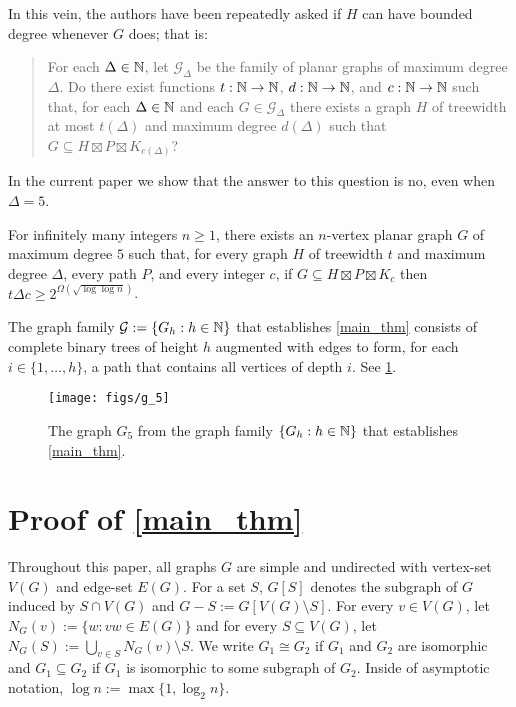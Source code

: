 \documentclass{patmorin}
\newcommand\subsetcong{\mathrel{\text{%
    \setbox0\hbox{$\subseteq$}%
    \rlap{\hbox to \wd0{\hss\hss\hss\raisebox{1.5\height}{$\sim$}\hss}}\box0
}}}
\renewcommand{\subsetcong}{\subseteq}
\renewcommand{\ge}{\geqslant}
\begin{document}
In this vein, the authors have been repeatedly asked if $H$ can have bounded degree whenever $G$ does; that is:
\begin{quote}
  For each $\Delta\in\mathbb{N}$, let $\mathcal{G}_\Delta$ be the family of planar graphs of maximum degree $\Delta$.  Do there exist functions $t:\mathbb{N}\to\mathbb{N}$, $d:\mathbb{N}\to\mathbb{N}$, and $c:\mathbb{N}\to\mathbb{N}$ such that, for each $\Delta\in\mathbb{N}$ and each $G\in\mathcal{G}_\Delta$ there exists a graph $H$ of treewidth at most $t(\Delta)$ and maximum degree $d(\Delta)$ such that $G\subsetcong H\boxtimes P\boxtimes K_{c(\Delta)}$?
\end{quote}
In the current paper we show that the answer to this question is no, even when $\Delta=5$.

\begin{thm}\label{main_thm}
  For infinitely many integers $n\ge 1$, there exists an $n$-vertex planar graph $G$ of maximum degree $5$ such that, for every graph $H$ of treewidth $t$ and maximum degree $\Delta$, every path $P$, and every integer $c$, if $G\subsetcong H\boxtimes P\boxtimes K_c$ then $t\Delta c \ge 2^{\Omega(\sqrt{\log\log n})}$.
\end{thm}

The graph family $\mathcal{G}:=\{G_h:h\in\mathbb{N}\}$ that establishes \cref{main_thm} consists of complete binary trees of height $h$ augmented with edges to form, for each $i\in\{1,\ldots,h\}$, a path that contains all vertices of depth $i$.  See \cref{G_5}.

\begin{figure}
  \begin{center}
    \texttt{[image: figs/g\_5]}
  \end{center}
  \caption{The graph $G_5$ from the graph family $\{G_h:h\in\mathbb{N}\}$ that establishes \cref{main_thm}.}
  \label{G_5}
\end{figure}

\section{Proof of \cref{main_thm}}

Throughout this paper, all graphs $G$ are simple and undirected with vertex-set $V(G)$ and edge-set $E(G)$.  For a set $S$, $G[S]$ denotes the subgraph of $G$ induced by $S\cap V(G)$ and $G-S:=G[V(G)\setminus S]$.  For every $v\in V(G)$, let $N_G(v):=\{w:vw\in E(G)\}$ and for every $S\subseteq V(G)$, let $N_G(S):=\bigcup_{v\in S} N_G(v)\setminus S$.  We write $G_1\cong G_2$ if $G_1$ and $G_2$ are isomorphic and $G_1\subsetcong G_2$ if $G_1$ is isomorphic to some subgraph of $G_2$.  Inside of asymptotic notation, $\log n:=\max\{1,\log_2 n\}$.
\end{document}
